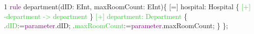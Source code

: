 {

1\hspace{0.5cm} \textcolor{Purple}{rule} department(dID: EInt, maxRoomCount: EInt)\{\hspace{1cm}	[=] hospital: Hospital \{\hspace{1.5cm}	\textcolor{LimeGreen}{[+] -department -> department} \hspace{1cm}	\}\hspace{1cm}   \textcolor{LimeGreen}{[+] department: Department} \{ \hspace{1.5cm}	    .\textcolor{LimeGreen}{dID}:=\textcolor{Purple}{parameter}.dID; \hspace{1.5cm}	    .\textcolor{LimeGreen}{maxRoomCount}:=\textcolor{Purple}{parameter}.maxRoomCount; \hspace{1cm}		\} \hspace{0.5cm}\}; \newline\newline

}
